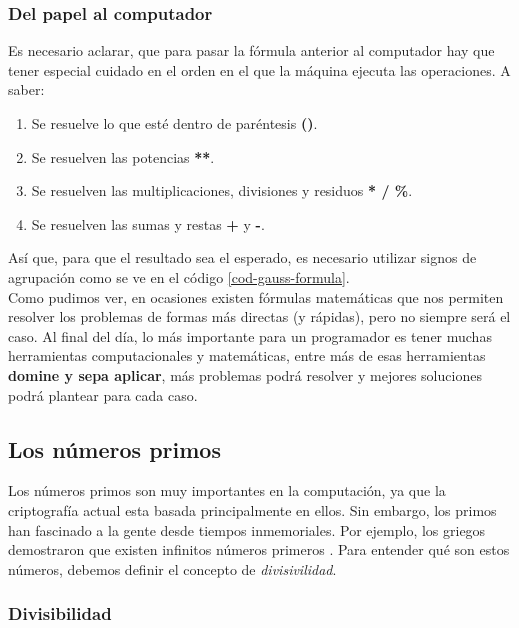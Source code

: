 \subsubsection{Del papel al computador}

Es necesario aclarar, que para pasar la fórmula anterior al computador hay que tener especial cuidado en el orden en el que la máquina ejecuta las operaciones. A saber:

	\begin{enumerate}
	\item Se resuelve lo que esté dentro de paréntesis \textbf{()}.
	\item Se resuelven las potencias \textbf{**}.
	\item Se resuelven las multiplicaciones, divisiones y residuos  \textbf{* / \%}. 
	\item Se resuelven las sumas y restas  \textbf{+} y \textbf{-}.
	\end{enumerate}
	
Así que, para que el resultado sea el esperado, es necesario utilizar signos de agrupación como se ve en el código \ref{cod-gauss-formula}. \\



Como pudimos ver, en ocasiones existen fórmulas matemáticas que nos permiten resolver los problemas de formas más directas (y rápidas), pero no siempre será el caso. Al final del día, lo más importante para un programador es tener muchas herramientas computacionales y matemáticas, entre más de esas herramientas \textbf{domine y sepa aplicar}, más problemas podrá resolver y mejores soluciones podrá plantear para cada caso.

\subsection{Los números primos}

Los números primos son muy importantes en la computación, ya que la criptografía actual esta basada principalmente en ellos. Sin embargo, los primos han fascinado a la gente desde tiempos inmemoriales. Por ejemplo, los griegos demostraron que existen infinitos números primeros \cite{discretemath}. Para entender qué son estos números, debemos definir el concepto de \emph{divisivilidad}.

\subsubsection{Divisibilidad}

